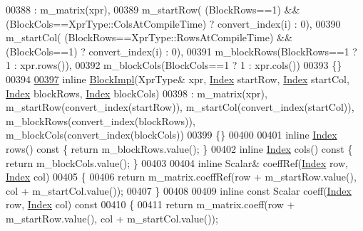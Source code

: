 \begin{DoxyCode}
00388       : m\_matrix(xpr),
00389         m\_startRow( (BlockRows==1) && (BlockCols==XprType::ColsAtCompileTime) ? convert\_index(i) : 0),
00390         m\_startCol( (BlockRows==XprType::RowsAtCompileTime) && (BlockCols==1) ? convert\_index(i) : 0),
00391         m\_blockRows(BlockRows==1 ? 1 : xpr.rows()),
00392         m\_blockCols(BlockCols==1 ? 1 : xpr.cols())
00393     \{\}
00394 
\hyperlink{class_eigen_1_1_block_impl_3_01_xpr_type_00_01_block_rows_00_01_block_cols_00_01_inner_panel_00_01_sparse_01_4_a2fe461bd49f27e586b7d0e652e370644}{00397}     \textcolor{keyword}{inline} \hyperlink{class_eigen_1_1_block_impl_3_01_xpr_type_00_01_block_rows_00_01_block_cols_00_01_inner_panel_00_01_sparse_01_4_a2fe461bd49f27e586b7d0e652e370644}{BlockImpl}(XprType& xpr, \hyperlink{group___core___module_a554f30542cc2316add4b1ea0a492ff02}{Index} startRow, \hyperlink{group___core___module_a554f30542cc2316add4b1ea0a492ff02}{Index} startCol, 
      \hyperlink{group___core___module_a554f30542cc2316add4b1ea0a492ff02}{Index} blockRows, \hyperlink{group___core___module_a554f30542cc2316add4b1ea0a492ff02}{Index} blockCols)
00398       : m\_matrix(xpr), m\_startRow(convert\_index(startRow)), m\_startCol(convert\_index(startCol)), 
      m\_blockRows(convert\_index(blockRows)), m\_blockCols(convert\_index(blockCols))
00399     \{\}
00400 
00401     \textcolor{keyword}{inline} \hyperlink{group___core___module_a554f30542cc2316add4b1ea0a492ff02}{Index} rows()\textcolor{keyword}{ const }\{ \textcolor{keywordflow}{return} m\_blockRows.value(); \}
00402     \textcolor{keyword}{inline} \hyperlink{group___core___module_a554f30542cc2316add4b1ea0a492ff02}{Index} cols()\textcolor{keyword}{ const }\{ \textcolor{keywordflow}{return} m\_blockCols.value(); \}
00403 
00404     \textcolor{keyword}{inline} Scalar& coeffRef(\hyperlink{group___core___module_a554f30542cc2316add4b1ea0a492ff02}{Index} row, \hyperlink{group___core___module_a554f30542cc2316add4b1ea0a492ff02}{Index} col)
00405     \{
00406       \textcolor{keywordflow}{return} m\_matrix.coeffRef(row + m\_startRow.value(), col + m\_startCol.value());
00407     \}
00408 
00409     \textcolor{keyword}{inline} \textcolor{keyword}{const} Scalar coeff(\hyperlink{group___core___module_a554f30542cc2316add4b1ea0a492ff02}{Index} row, \hyperlink{group___core___module_a554f30542cc2316add4b1ea0a492ff02}{Index} col)\textcolor{keyword}{ const}
00410 \textcolor{keyword}{    }\{
00411       \textcolor{keywordflow}{return} m\_matrix.coeff(row + m\_startRow.value(), col + m\_startCol.value());

\end{DoxyCode}
